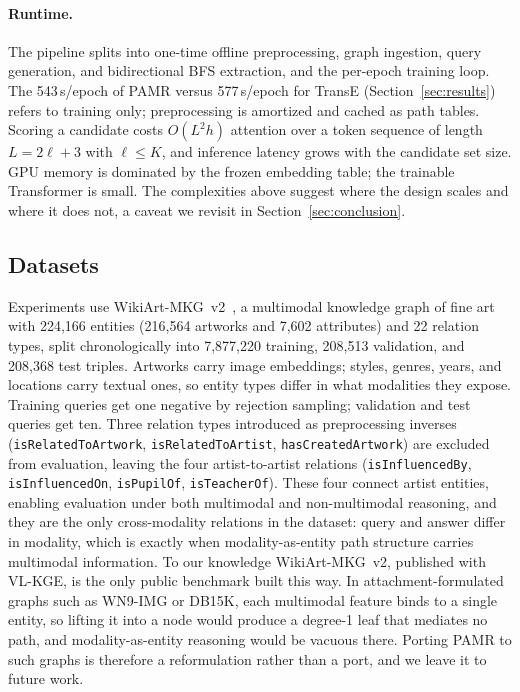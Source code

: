 \documentclass[runningheads]{llncs}
\begin{document}
\paragraph{Runtime.}
The pipeline splits into one-time offline preprocessing, graph ingestion,
query generation, and bidirectional BFS extraction, and the per-epoch
training loop. The 543\,s/epoch of PAMR versus 577\,s/epoch for TransE
(Section~\ref{sec:results}) refers to training only; preprocessing is
amortized and cached as path tables. Scoring a candidate costs
$O(L^{2}h)$ attention over a token sequence of length $L = 2\ell + 3$
with $\ell \le K$, and inference
latency grows with the candidate set size. GPU memory is dominated by
the frozen embedding table; the trainable Transformer is small. The
complexities above suggest where the design scales and where it does
not, a caveat we revisit in Section~\ref{sec:conclusion}.

\subsection{Datasets}
\label{sec:datasets}

Experiments use WikiArt-MKG~v2~\cite{efthymiou2026vlkge}, a multimodal
knowledge graph of fine art with 224,166 entities (216,564 artworks and
7,602 attributes) and 22 relation types, split chronologically into
7,877,220 training, 208,513 validation, and 208,368 test triples.
Artworks carry image embeddings; styles, genres, years, and locations
carry textual ones, so entity types differ in what modalities they
expose. Training queries get one negative by rejection sampling;
validation and test queries get ten. Three relation types introduced as
preprocessing inverses
(\texttt{isRelatedToArtwork}, \texttt{isRelatedToArtist},
\texttt{hasCreatedArtwork}) are excluded from evaluation, leaving the
four artist-to-artist relations (\texttt{isInfluencedBy},
\texttt{isInfluencedOn}, \texttt{isPupilOf}, \texttt{isTeacherOf}).
These four connect artist entities, enabling evaluation under both
multimodal and non-multimodal reasoning, and they are the only
cross-modality relations in the dataset: query and answer differ in
modality, which is exactly when modality-as-entity path structure
carries multimodal information. To our knowledge WikiArt-MKG~v2,
published with VL-KGE, is the only public benchmark built this way. In
attachment-formulated graphs such as WN9-IMG or DB15K, each multimodal
feature binds to a single entity, so lifting it into a node would
produce a degree-1 leaf that mediates no path, and modality-as-entity
reasoning would be vacuous there. Porting PAMR to such graphs is
therefore a reformulation rather than a port, and we leave it to
future work.
\end{document}
